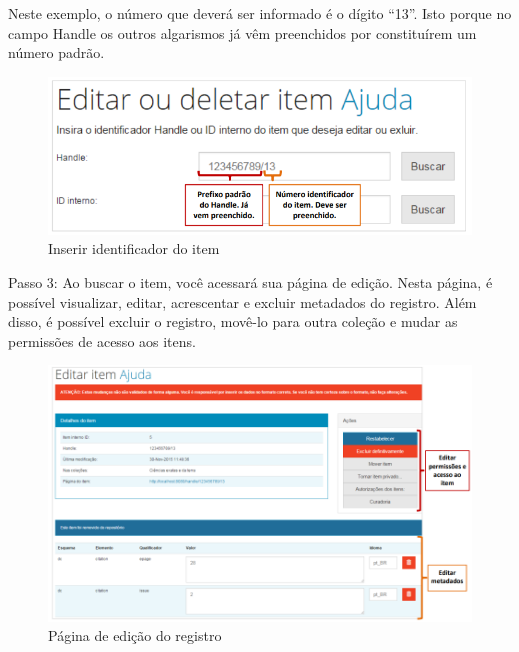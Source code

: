 \documentclass[12pt,hidelinks]{article}
\begin{document}
\newpage
    
    Neste exemplo, o número que deverá ser informado é o dígito “13”. Isto porque no campo Handle os outros algarismos já vêm preenchidos por constituírem um número padrão.
    
    \begin{figure}[!htp]
                \centering
                \includegraphics[scale=0.8]{figura/Figura89.png}
                \caption{Inserir identificador do item}
            \label{Rotulo}
        \end{figure}
    
    \singlespacing
    
    Passo 3: Ao buscar o item, você acessará sua página de edição. Nesta página, é possível visualizar, editar, acrescentar e excluir metadados do registro. Além disso, é possível excluir o registro, movê-lo para outra coleção e mudar as permissões de acesso aos itens.
    
    \begin{figure}[!htp]
                \centering
                \includegraphics[scale=0.7]{figura/Figura90.png}
                \caption{Página de edição do registro}
            \label{Rotulo}
        \end{figure}
    
\end{document}
